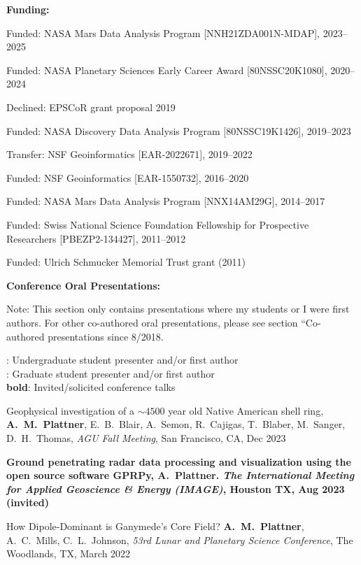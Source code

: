 \documentclass[10pt]{article}
\begin{document}
\spc
\textbf{\tsize Funding:}

\spcp
Funded: NASA Mars Data Analysis Program [NNH21ZDA001N-MDAP], 2023--2025

\spcp
Funded: NASA Planetary Sciences Early Career Award [80NSSC20K1080], 2020--2024

\spcp Declined: EPSCoR grant proposal 2019

\spcp
Funded: NASA Discovery Data Analysis Program [80NSSC19K1426], 2019--2023

\spcp
Transfer: NSF Geoinformatics [EAR-2022671], 2019--2022 

\spcp
  Funded: NSF Geoinformatics
  [EAR-1550732],
  2016--2020

 \spcp 
Funded: NASA Mars Data Analysis Program [NNX14AM29G], 2014--2017

\spcp Funded: Swiss National Science Foundation Fellowship for Prospective Researchers
[PBEZP2-134427], 2011--2012

\spcp
Funded: Ulrich Schmucker Memorial Trust grant (2011)


\spc
\textbf{\tsize Conference Oral Presentations:}

\vspace{0.2cm}
Note: This section only contains presentations where my students or I were first authors. For other co-authored oral presentations, please see section ``Co-authored presentations since 8/2018.

\spcp
\ug: Undergraduate student presenter and/or first author\\
\gr: Graduate student presenter and/or first author\\
\textbf{bold}: Invited/solicited conference talks

\spcp
Geophysical investigation of a $\sim4500$ year old Native American shell ring, \textbf{A.~M.~Plattner}, E.~B.~Blair, A.~Semon, R.~Cajigas, T.~Blaber, M.~Sanger, D.~H.~Thomas,  \emph{AGU Fall Meeting}, San Francisco, CA, Dec 2023

\spcp
\textbf{Ground penetrating radar data processing and visualization using the open source software GPRPy, A.~Plattner. \emph{The International Meeting for
Applied Geoscience \& Energy (IMAGE)}, Houston TX, Aug 2023 (invited)}

\spcp
\hspace{-0.4cm} \gr \hspace{-0.03cm} How Dipole-Dominant is Ganymede’s Core Field? \textbf{A.~M.~Plattner}, A.~C.~Mills, C.~L.~Johnson, \emph{53rd Lunar and Planetary Science Conference},
The Woodlands, TX, March 2022
\end{document}
